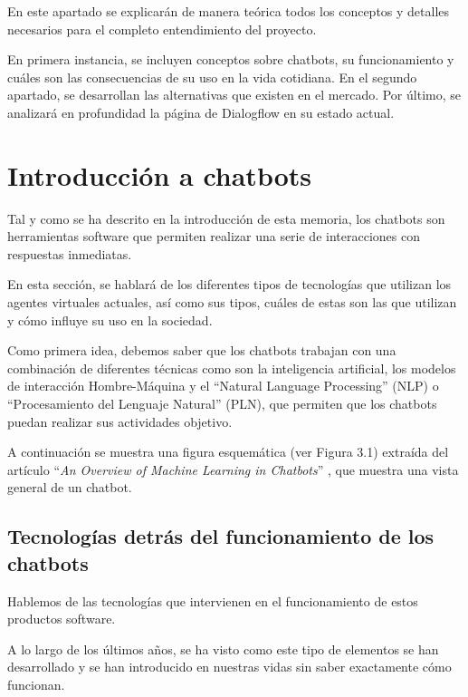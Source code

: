 En este apartado se explicarán de manera teórica todos los conceptos y detalles necesarios para el completo entendimiento del proyecto.

En primera instancia, se incluyen conceptos sobre chatbots, su funcionamiento y cuáles son las consecuencias de su uso en la vida cotidiana. En el segundo apartado, se desarrollan las alternativas que existen en el mercado. Por último, se analizará en profundidad la página de Dialogflow en su estado actual.

\section{Introducción a chatbots}
Tal y como se ha descrito en la introducción de esta memoria, los chatbots son herramientas software que permiten realizar una serie de interacciones con respuestas inmediatas. 

En esta sección, se hablará de los diferentes tipos de tecnologías que utilizan los agentes virtuales actuales, así como sus tipos, cuáles de estas son las que utilizan y cómo influye su uso en la sociedad.

Como primera idea, debemos saber que los chatbots trabajan con una combinación de diferentes técnicas como son la inteligencia artificial, los modelos de interacción Hombre-Máquina \cite{bansal2018review} y el ``Natural Language Processing'' (NLP) \cite{khurana2023natural} o ``Procesamiento del Lenguaje Natural'' (PLN), que permiten que los chatbots puedan realizar sus actividades objetivo. 

A continuación se muestra una figura esquemática (ver Figura 3.1) extraída del artículo ``\textit{An Overview of Machine Learning in Chatbots}'' \cite{suta2020overview}, que muestra una vista general de un chatbot.


\subsection{Tecnologías detrás del funcionamiento de los chatbots}
Hablemos de las tecnologías que intervienen en el funcionamiento de estos productos software. 

A lo largo de los últimos años, se ha visto como este tipo de elementos se han desarrollado y se han introducido en nuestras vidas sin saber exactamente cómo funcionan. 

